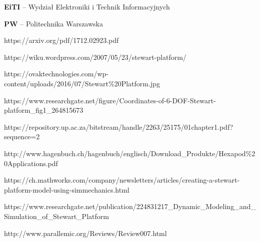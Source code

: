 \documentclass[
    left=2.5cm,         %
    right=2.5cm,        %
    top=2.5cm,          %
    bottom=3cm,         %
    bindingoffset=6mm,  %
    nohyphenation=false %
]{eiti/eiti-thesis}
\begin{document}
\newpage

\vspace{0.8cm}
\begin{acronym}
    \item \textbf{EiTI} -- Wydział Elektroniki i Technik Informacyjnych
    \item \textbf{PW} -- Politechnika Warszawska
\end{acronym}
\vspace{1cm}                %

\listoffigures              %
\vspace{1cm}                %
\listoftables               %
\vspace{1cm}                %

\begin{appendix}            %
    \item https://arxiv.org/pdf/1712.02923.pdf
    \item https://wiku.wordpress.com/2007/05/23/stewart-platform/
    \item https://ovaktechnologies.com/wp-content/uploads/2016/07/Stewart\%20Platform.jpg
    \item https://www.researchgate.net/figure/Coordinates-of-6-DOF-Stewart-platform\_fig1\_264815673
    \item https://repository.up.ac.za/bitstream/handle/2263/25175/01chapter1.pdf?sequence=2
    \item http://www.hagenbuch.ch/hagenbuch/englisch/Download_Produkte/Hexapod\%20Applications.pdf
    \item https://ch.mathworks.com/company/newsletters/articles/creating-a-stewart-platform-model-using-simmechanics.html
    \item https://www.researchgate.net/publication/224831217\_Dynamic\_Modeling\_and\_Simulation\_of\_Stewart\_Platform
    \item http://www.parallemic.org/Reviews/Review007.html
\end{appendix}

\end{document}
